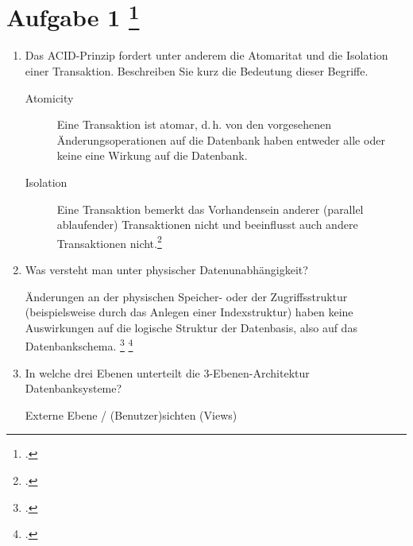\documentclass{lehramt-informatik-aufgabe}
\begin{document}
\section{Aufgabe 1
\footcite{66116:2019:03}}

\begin{enumerate}


\item Das ACID-Prinzip fordert unter anderem die Atomaritat und die
Isolation einer Transaktion. Beschreiben Sie kurz die Bedeutung dieser
Begriffe.

\begin{liAntwort}
\begin{description}
\item[Atomicity]

Eine Transaktion ist atomar, d.\,h. von den vorgesehenen
Änderungsoperationen auf die Datenbank haben entweder alle oder keine
eine Wirkung auf die Datenbank.

\item[Isolation]

Eine Transaktion bemerkt das Vorhandensein anderer (parallel
ablaufender) Transaktionen nicht und beeinflusst auch andere
Transaktionen nicht.\footcite[Kapitel 9.5 „Eigenschaften von Transaktionen“, Seite 305]{kemper}
\end{description}
\end{liAntwort}


\item Was versteht man unter physischer Datenunabhängigkeit?

\begin{liAntwort}
Änderungen an der physischen Speicher- oder der Zugriffsstruktur
(beispielsweise durch das Anlegen einer Indexstruktur) haben keine
Auswirkungen auf die logische Struktur der Datenbasis, also auf das
Datenbankschema.
\footcite[Seite 20]{db:fs:3}
\footcite[Kapitel 1.3 Datenunabhängigkeit Seite 24]{kemper}
\end{liAntwort}


\item In welche drei Ebenen unterteilt die 3-Ebenen-Architektur
Datenbanksysteme?

\begin{liAntwort}

\begin{description}
\item[Externe Ebene / (Benutzer)sichten (Views)]


\end{description}
\end{liAntwort}
\end{enumerate}
\end{document}

